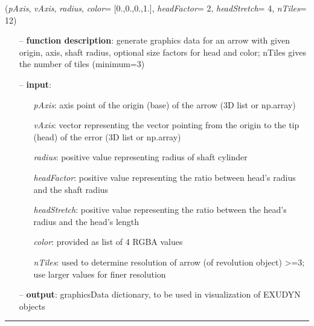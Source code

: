 \begin{itemize}[leftmargin=1.4cm]
\begin{itemize}[leftmargin=0.5cm]
\begin{itemize}[leftmargin=1.4cm]
\begin{itemize}[leftmargin=0.5cm]
\begin{itemize}[leftmargin=1.4cm]
\begin{itemize}[leftmargin=0.5cm]
\begin{flushleft}
\label{sec:graphicsDataUtilities:GraphicsDataArrow}
({\it pAxis}, {\it vAxis}, {\it radius}, {\it color}= [0.,0.,0.,1.], {\it headFactor}= 2, {\it headStretch}= 4, {\it nTiles}= 12)
\end{flushleft}
\setlength{\itemindent}{0.7cm}
\begin{itemize}[leftmargin=0.7cm]
  \item[--]  {\bf function description}: generate graphics data for an arrow with given origin, axis, shaft radius, optional size factors for head and color; nTiles gives the number of tiles (minimum=3)  \item[--]  {\bf input}: \vspace{-6pt}
  \begin{itemize}[leftmargin=1.2cm]
\setlength{\itemindent}{-0.7cm}
    \item[] {\it pAxis}: axis point of the origin (base) of the arrow (3D list or np.array)
    \item[] {\it   vAxis}: vector representing the vector pointing from the origin to the tip (head) of the error (3D list or np.array)
    \item[] {\it   radius}: positive value representing radius of shaft cylinder
    \item[] {\it   headFactor}: positive value representing the ratio between head's radius and the shaft radius
    \item[] {\it   headStretch}: positive value representing the ratio between the head's radius and the head's length
    \item[] {\it   color}: provided as list of 4 RGBA values
    \item[] {\it   nTiles}: used to determine resolution of arrow (of revolution object) >=3; use larger values for finer resolution
  \end{itemize}
  \item[--]  {\bf output}: graphicsData dictionary, to be used in visualization of EXUDYN objects\vspace{12pt}\end{itemize}
%
\noindent\rule{8cm}{0.75pt}\vspace{1pt} \\ 
\begin{flushleft}
\label{sec:graphicsDataUtilities:GraphicsDataBasis}

\end{flushleft}
\end{itemize}
\end{itemize}
\end{itemize}
\end{itemize}
\end{itemize}
\end{itemize}
